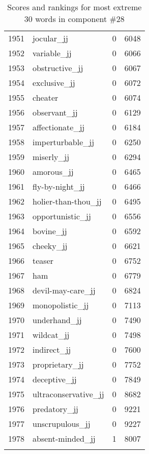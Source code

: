 \begin{longtable}[!htbp]{| rlr@{.}l |}
    1951 & jocular\_jj & 0 & 6048 \\
    1952 & variable\_jj & 0 & 6066 \\
    1953 & obstructive\_jj & 0 & 6067 \\
    1954 & exclusive\_jj & 0 & 6072 \\
    1955 & cheater & 0 & 6074 \\
    1956 & observant\_jj & 0 & 6129 \\
    1957 & affectionate\_jj & 0 & 6184 \\
    1958 & imperturbable\_jj & 0 & 6250 \\
    1959 & miserly\_jj & 0 & 6294 \\
    1960 & amorous\_jj & 0 & 6465 \\
    1961 & fly-by-night\_jj & 0 & 6466 \\
    1962 & holier-than-thou\_jj & 0 & 6495 \\
    1963 & opportunistic\_jj & 0 & 6556 \\
    1964 & bovine\_jj & 0 & 6592 \\
    1965 & cheeky\_jj & 0 & 6621 \\
    1966 & teaser & 0 & 6752 \\
    1967 & ham & 0 & 6779 \\
    1968 & devil-may-care\_jj & 0 & 6824 \\
    1969 & monopolistic\_jj & 0 & 7113 \\
    1970 & underhand\_jj & 0 & 7490 \\
    1971 & wildcat\_jj & 0 & 7498 \\
    1972 & indirect\_jj & 0 & 7600 \\
    1973 & proprietary\_jj & 0 & 7752 \\
    1974 & deceptive\_jj & 0 & 7849 \\
    1975 & ultraconservative\_jj & 0 & 8682 \\
    1976 & predatory\_jj & 0 & 9221 \\
    1977 & unscrupulous\_jj & 0 & 9227 \\
    1978 & absent-minded\_jj & 1 & 8007 \\
    \hline
    \caption{Scores and rankings for most extreme 30 words in component \#28} \\
\end{longtable}
